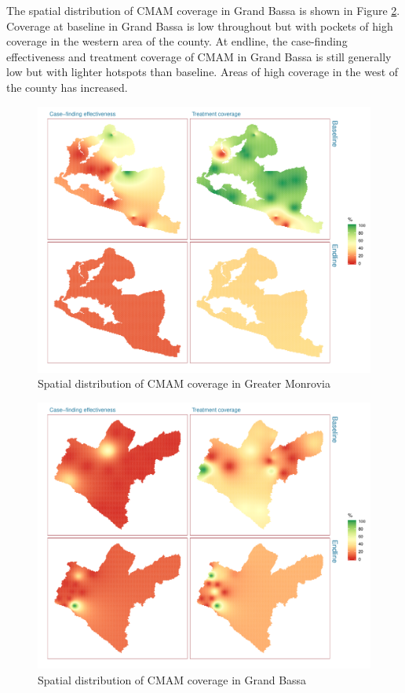 \documentclass[12pt,a4paper]{article}
\begin{document}
The spatial distribution of CMAM coverage in Grand Bassa is shown in Figure \ref{fig:cmamMap2}. Coverage at baseline in Grand Bassa is low throughout but with pockets of high coverage in the western area of the county. At endline, the case-finding effectiveness and treatment coverage of CMAM in Grand Bassa is still generally low but with lighter hotspots than baseline. Areas of high coverage in the west of the county has increased.

\begin{figure}[H]

{\centering \includegraphics{liberiaCoverageFinalReport_files/figure-latex/cmamMap1-1} 

}

\caption{Spatial distribution of CMAM coverage in Greater Monrovia}\label{fig:cmamMap1}
\end{figure}

\begin{figure}[H]

{\centering \includegraphics{liberiaCoverageFinalReport_files/figure-latex/cmamMap2-1} 

}

\caption{Spatial distribution of CMAM coverage in Grand Bassa}\label{fig:cmamMap2}
\end{figure}
\end{document}
